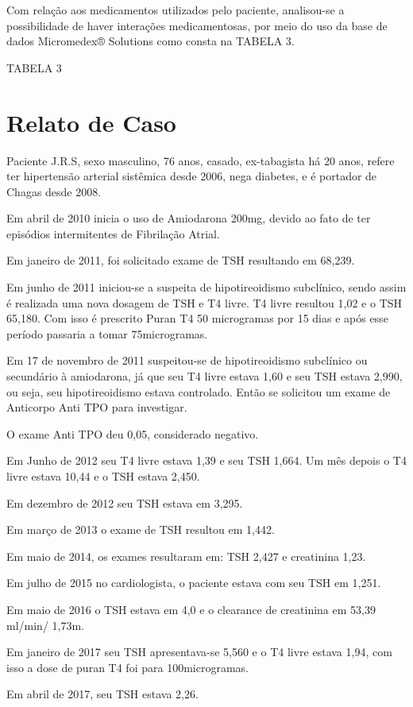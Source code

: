 \documentclass[svgnames,12pt,oneside, openright,a4paper]{scrbook}
\begin{document}
Com relação aos medicamentos utilizados pelo paciente, analisou-se a possibilidade de haver interações medicamentosas, por meio do uso da base de dados Micromedex® Solutions como consta na TABELA 3. 

TABELA 3

\chapter{Relato de Caso}

Paciente J.R.S, sexo masculino, 76 anos, casado, ex-tabagista há 20 anos, refere ter hipertensão arterial sistêmica desde 2006, nega diabetes, e é portador de Chagas desde 2008.  

Em abril de 2010 inicia o uso de Amiodarona 200mg, devido ao fato de ter episódios intermitentes de Fibrilação Atrial.

Em janeiro de 2011, foi solicitado exame de TSH resultando em 68,239. 

Em junho de 2011 iniciou-se a suspeita de hipotireoidismo subclínico, sendo assim é realizada uma nova dosagem de TSH e T4 livre. T4 livre resultou 1,02 e o TSH 65,180. Com isso é prescrito Puran T4 50 microgramas por 15 dias e após esse período passaria a tomar 75microgramas. 

Em 17 de novembro de 2011 suspeitou-se de hipotireoidismo subclínico ou secundário à amiodarona, já que seu T4 livre estava 1,60 e seu TSH estava 2,990, ou seja, seu hipotireoidismo estava controlado. Então se solicitou um exame de Anticorpo Anti TPO para investigar. 

O exame Anti TPO deu 0,05, considerado negativo. 

Em Junho de 2012 seu T4 livre estava 1,39 e seu TSH 1,664. Um mês depois o T4 livre estava 10,44 e o TSH estava 2,450.

Em dezembro de 2012 seu TSH estava em 3,295.

Em março de 2013 o exame de TSH resultou em 1,442. 

Em maio de 2014, os exames resultaram em: TSH 2,427 e creatinina 1,23.

Em julho de 2015 no cardiologista, o paciente estava com seu TSH em 1,251. 

Em maio de 2016 o TSH estava em 4,0 e o clearance de creatinina em 53,39 ml/min/ 1,73m. 

Em janeiro de 2017 seu TSH apresentava-se 5,560 e o T4 livre estava 1,94, com isso a dose de puran T4 foi para 100microgramas. 

Em abril de 2017, seu TSH estava 2,26. 
\end{document}
